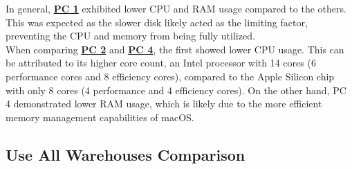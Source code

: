 In general, \textbf{\hyperref[tab:hardware-setup]{PC 1}} exhibited lower CPU and RAM usage compared to the others. This was expected as the slower disk likely acted as the limiting factor, preventing the CPU and memory from being fully utilized.\\

When comparing \textbf{\hyperref[tab:hardware-setup]{PC 2}} and \textbf{\hyperref[tab:hardware-setup]{PC 4}}, the first showed lower CPU usage. This can be attributed to its higher core count, an Intel processor with 14 cores (6 performance cores and 8 efficiency cores), compared to the Apple Silicon chip with only 8 cores (4 performance and 4 efficiency cores). On the other hand, PC 4 demonstrated lower RAM usage, which is likely due to the more efficient memory management capabilities of macOS.

\subsection{Use All Warehouses Comparison}

